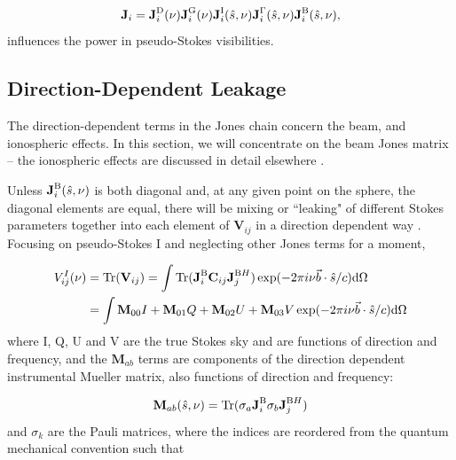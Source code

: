 \begin{equation}
\textbf{J}_i = \textbf{J}_i^{\rm D}(\nu) \textbf{J}_i^{\rm G}(\nu)  \textbf{J}_i^{\rm I}(\hat{s},\nu) \textbf{J}_i^{\rm \Gamma}(\hat{s},\nu)  \textbf{J}_i^{\rm B}(\hat{s},\nu) ,
\end{equation}
influences the power in pseudo-Stokes visibilities.

\subsection{Direction-Dependent Leakage}

The direction-dependent terms in the Jones chain concern the beam, and ionospheric effects. In this section, we will concentrate on the beam Jones matrix -- the ionospheric effects are discussed in detail elsewhere \citep[e.g.][{\color{red} Martinot et al. (in prep.)}]{Intema.09,Vedantham.15,Vedantham.16}.

Unless $\textbf{J}_i^{\rm B}(\hat{s},\nu)$ is both diagonal and, at any given point on the sphere, the diagonal elements are equal, there will be mixing or ``leaking" of different Stokes parameters together into each element of $\textbf{V}_{ij}$ in a direction dependent way \citep[e.g.][]{Geil.11, Smirnov.11, Smirnov.11.2, Nunhokee.17}. Focusing on pseudo-Stokes I and neglecting other Jones terms for a moment,

\begin{equation}
\begin{split}
V^I_{ij}(\nu) &= {\rm Tr}(\textbf{V}_{ij}) = \int {\rm Tr}(\textbf{J}_i^{\rm B}\textbf{C}_{ij}\textbf{J}_j^{{\rm B}H}) \exp(-2\pi i \nu \vec{b}\cdot\hat{s}/c) {\rm d}\Omega \\
					  &= \int \textbf{M}_{00}I + \textbf{M}_{01}Q + \textbf{M}_{02}U + \textbf{M}_{03}V \exp(-2\pi i \nu \vec{b}\cdot\hat{s}/c) {\rm d}\Omega
\end{split}
\label{eq:interferometry_pseudo-stokes-I-leakage}
\end{equation}
where I, Q, U and V are the true Stokes sky and are functions of direction and frequency, and the $\textbf{M}_{ab}$ terms are components of the direction dependent instrumental Mueller matrix, also functions of direction and frequency:

\begin{equation}
\textbf{M}_{ab}(\hat{s},\nu) = {\rm Tr} ( \sigma_a \textbf{J}_i^{\rm B} \sigma_b \textbf{J}_j^{{\rm B}H})
\label{eq:interferometry_mueller-terms}
\end{equation}
and $\sigma_k$ are the Pauli matrices, where the indices are reordered from the quantum mechanical convention such that 

